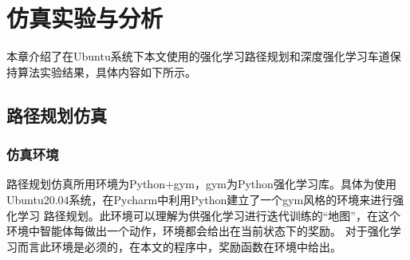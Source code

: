 \section{仿真实验与分析}
本章介绍了在Ubuntu系统下本文使用的强化学习路径规划和深度强化学习车道保持算法实验结果，具体内容如下所示。
\subsection{路径规划仿真}
\subsubsection{仿真环境}
路径规划仿真所用环境为Python+gym，gym为Python强化学习库。具体为使用Ubuntu20.04系统，在Pycharm中利用Python建立了一个gym风格的环境来进行强化学习
路径规划。此环境可以理解为供强化学习进行迭代训练的“地图”，在这个环境中智能体每做出一个动作，环境都会给出在当前状态下的奖励。
对于强化学习而言此环境是必须的，在本文的程序中，奖励函数在环境中给出。
